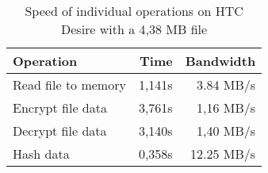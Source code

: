 \begin{table}
  \centering
  \caption{Speed of individual operations on HTC Desire with a 4,38 MB file}
  \begin{tabular}{ | l | r | r |}
    \hline
   \textbf{Operation} & \textbf{Time} & \textbf{Bandwidth} \\ \hline
   Read file to memory  & 1,141s & 3.84 MB/s       \\ \hline
   Encrypt file data    & 3,761s & 1,16 MB/s    \\  \hline
   Decrypt file data    & 3,140s & 1,40 MB/s    \\ \hline
   Hash data            & 0,358s & 12.25 MB/s   \\ \hline
  \end{tabular}
  \label{tbl:desire:pinpoint}
\end{table}
